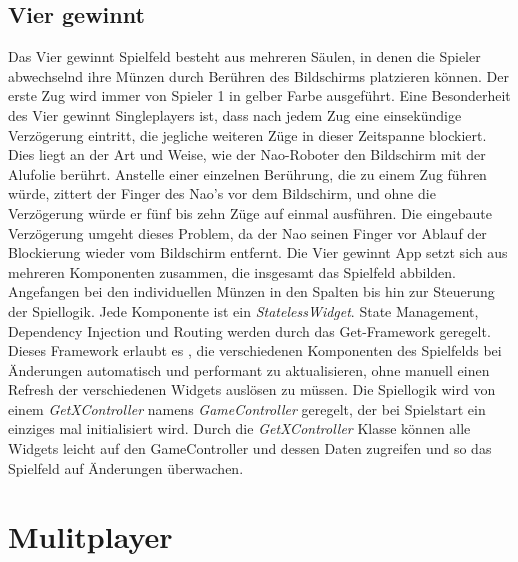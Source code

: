 \subsection{Vier gewinnt}
Das Vier gewinnt Spielfeld besteht aus mehreren Säulen, in denen die Spieler abwechselnd ihre Münzen durch Berühren des Bildschirms platzieren können. Der erste Zug wird immer von Spieler 1 in gelber Farbe ausgeführt. Eine Besonderheit des Vier gewinnt Singleplayers ist, dass nach jedem Zug eine einsekündige Verzögerung eintritt, die jegliche weiteren Züge in dieser Zeitspanne blockiert. Dies liegt an der Art und Weise, wie der Nao-Roboter den Bildschirm mit der Alufolie berührt. Anstelle einer einzelnen Berührung, die zu einem Zug führen würde, zittert der Finger des Nao's vor dem Bildschirm, und ohne die Verzögerung würde er fünf bis zehn Züge auf einmal ausführen. Die eingebaute Verzögerung umgeht dieses Problem, da der Nao seinen Finger vor Ablauf der Blockierung wieder vom Bildschirm entfernt.
\newline
\newline
Die Vier gewinnt App setzt sich aus mehreren Komponenten zusammen, die insgesamt das Spielfeld abbilden. Angefangen bei den individuellen Münzen in den Spalten bis hin zur Steuerung der Spiellogik. Jede Komponente ist ein \textit{StatelessWidget}. State Management, Dependency Injection und Routing werden durch das Get-Framework geregelt. Dieses Framework erlaubt es , die verschiedenen Komponenten des Spielfelds bei Änderungen automatisch und performant zu aktualisieren, ohne manuell einen Refresh der verschiedenen Widgets auslösen zu müssen. Die Spiellogik wird von einem \textit{GetXController} namens \textit{GameController} geregelt, der bei Spielstart ein einziges mal initialisiert wird. Durch die \textit{GetXController} Klasse können alle Widgets leicht auf den GameController und dessen Daten zugreifen und so das Spielfeld auf Änderungen überwachen.


\section{Mulitplayer}
